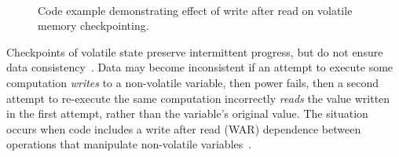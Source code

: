 \begin{figure}
	\centering
	\\
	\caption{Code example demonstrating effect of write after read on volatile memory checkpointing.}
	\label{fig:code_demo_incosistency}
\end{figure}

Checkpoints of volatile state preserve intermittent progress, but do not ensure
data consistency~\cite{dino,chain,ratchet}.  Data may become inconsistent if an
attempt to execute some computation {\em writes} to a non-volatile variable,
then power fails, then a second attempt to re-execute the same computation
incorrectly {\em reads} the value written in the first attempt, rather than the
variable's original value.  The situation occurs when code includes a write
after read (WAR) dependence between operations that manipulate non-volatile
variables~\cite{ratchet,dino,alpaca}.

